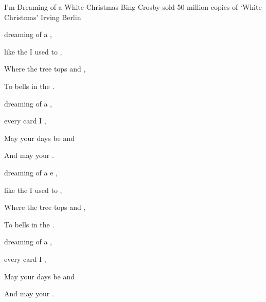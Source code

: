 \begin{SBSong}{I'm Dreaming of a White Christmas}
    {Bing Crosby sold 50 million copies of `White Christmas'}
    {Irving Berlin}
  \begin{SBVerse}
	 dreaming of a  ,

	 like the  I used to ,

	Where the tree tops  and  ,

	To   bells in the . 
  \end{SBVerse}
  \begin{SBVerse}
	 dreaming of a  ,

	 every  card I ,

	May your days be  and  

	And may  your   . 
  \end{SBVerse}
  \begin{SBVerse}
	 dreaming of a e ,

	 like the  I used to ,

	Where the tree tops  and  ,

	To   bells in the . 
  \end{SBVerse}
  \begin{SBVerse}
	 dreaming of a  ,

	 every  card I ,

	May your days be  and  

	And may  your   .
  \end{SBVerse}
\end{SBSong}
